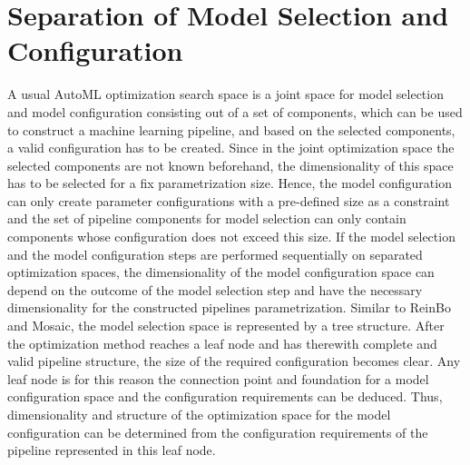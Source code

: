 \section{Separation of Model Selection and Configuration}
\label{sec:approach:separation}
A usual AutoML optimization search space is a joint space for model selection and model configuration consisting out of a set of components, which can be used to construct a machine learning pipeline, and based on the selected components, a valid configuration has to be created.
Since in the joint optimization space the selected components are not known beforehand, the dimensionality of this space has to be selected for a fix parametrization size.
Hence, the model configuration can only create parameter configurations with a pre-defined size as a constraint and the set of pipeline components for model selection can only contain components whose configuration does not exceed this size.\newline
If the model selection and the model configuration steps are performed sequentially on separated optimization spaces, the dimensionality of the model configuration space can depend on the outcome of the model selection step and have the necessary dimensionality for the constructed pipelines parametrization.\newline
Similar to ReinBo and Mosaic, the model selection space is represented by a tree structure.
After the optimization method reaches a leaf node and has therewith complete and valid pipeline structure, the size of the required configuration becomes clear.
Any leaf node is for this reason the connection point and foundation for a model configuration space and the configuration requirements can be deduced.
Thus, dimensionality and structure of the optimization space for the model configuration can be determined from the configuration requirements of the pipeline represented in this leaf node.

